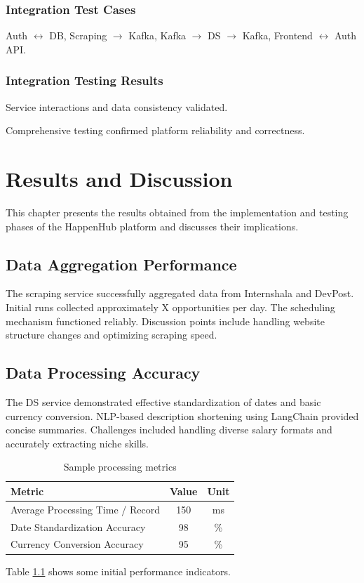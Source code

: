 \documentclass[12pt, a4paper]{report}
\begin{document}
\subsection{Integration Test Cases}
Auth $\leftrightarrow$ DB, Scraping $\rightarrow$ Kafka, Kafka $\rightarrow$ DS $\rightarrow$ Kafka, Frontend $\leftrightarrow$ Auth API.
\subsection{Integration Testing Results} Service interactions and data consistency validated.

\noindent Comprehensive testing confirmed platform reliability and correctness.

\chapter{Results and Discussion}

This chapter presents the results obtained from the implementation and testing phases of the HappenHub platform and discusses their implications.

\section{Data Aggregation Performance}
The scraping service successfully aggregated data from Internshala and DevPost. Initial runs collected approximately X opportunities per day. The scheduling mechanism functioned reliably. Discussion points include handling website structure changes and optimizing scraping speed.

\section{Data Processing Accuracy}
The DS service demonstrated effective standardization of dates and basic currency conversion. NLP-based description shortening using LangChain provided concise summaries. Challenges included handling diverse salary formats and accurately extracting niche skills.
\begin{table}[htbp]
\centering
\caption{Sample processing metrics} %
\label{tab:processing_metrics}
\begin{tabular}{@{}lcc@{}}
\toprule
Metric & Value & Unit \\
\midrule
Average Processing Time / Record & 150 & ms \\
Date Standardization Accuracy & 98 & \% \\
Currency Conversion Accuracy & 95 & \% \\
\bottomrule
\end{tabular}
\end{table}
Table \ref{tab:processing_metrics} shows some initial performance indicators.
\end{document}
